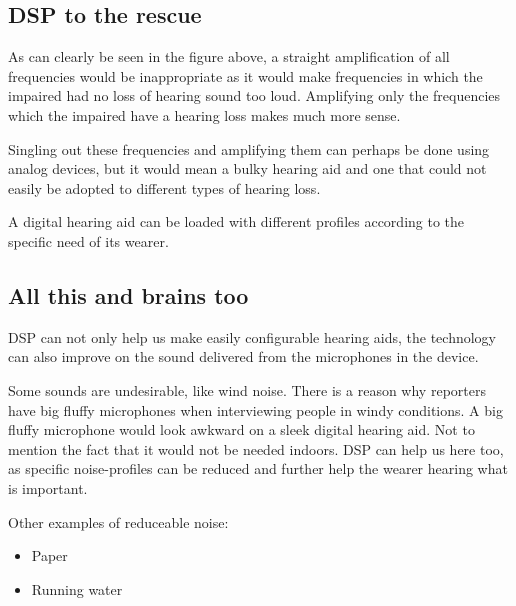 \documentclass[a4wide,10pt]{article}
\begin{document}
\subsection{DSP to the rescue} %
\label{sub:dsp_to_the_rescue}
As can clearly be seen in the figure above, a straight amplification of all frequencies would be inappropriate as it would make frequencies in which the impaired had no loss of hearing sound too loud. Amplifying only the frequencies which the impaired have a hearing loss makes much more sense.

Singling out these frequencies and amplifying them can perhaps be done using analog devices, but it would mean a bulky hearing aid and one that could not easily be adopted to different types of hearing loss.

A digital hearing aid can be loaded with different profiles according to the specific need of its wearer.

\subsection{All this and brains too} %
\label{sub:all_this_and_brains_too}
DSP can not only help us make easily configurable hearing aids, the technology can also improve on the sound delivered from the microphones in the device.

Some sounds are undesirable, like wind noise. There is a reason why reporters have big fluffy microphones when interviewing people in windy conditions. A big fluffy microphone would look awkward on a sleek digital hearing aid. Not to mention the fact that it would not be needed indoors. DSP can help us here too, as specific noise-profiles can be reduced and further help the wearer hearing what is important.

Other examples of reduceable noise:

\begin{itemize}
	\item Paper
	\item Running water
\end{itemize}
\end{document}
